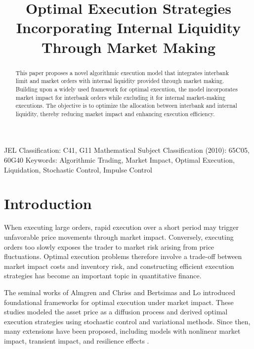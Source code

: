 \documentclass[12pt]{article}
\begin{document}
\title{Optimal Execution Strategies Incorporating Internal Liquidity Through Market Making}

\date{}
\maketitle
\begin{abstract}
This paper proposes a novel algorithmic execution model that integrates interbank limit and market orders with internal liquidity provided through market making. 
Building upon a widely used framework for optimal execution, the model incorporates market impact for interbank orders while excluding it for internal market-making executions. The objective is to optimize the allocation between interbank and internal liquidity, thereby reducing market impact and enhancing execution efficiency.
\end{abstract}

JEL Classification: C41, G11
Mathematical Subject Classification (2010): 65C05, 60G40
Keywords: Algorithmic Trading, Market Impact, Optimal Execution, Liquidation, Stochastic Control, Impulse Control

\section{Introduction}

When executing large orders, rapid execution over a short period may trigger unfavorable price movements through market impact. 
Conversely, executing orders too slowly exposes the trader to market risk arising from price fluctuations. 
Optimal execution problems therefore involve a trade-off between market impact costs and inventory risk, and constructing efficient execution strategies has become an important topic in quantitative finance.

The seminal works of Almgren and Chriss \cite{almgren2001optimal} and Bertsimas and Lo \cite{bertsimas1998optimal} introduced foundational frameworks for optimal execution under market impact. 
These studies modeled the asset price as a diffusion process and derived optimal execution strategies using stochastic control and variational methods. 
Since then, many extensions have been proposed, including models with nonlinear market impact, transient impact, and resilience effects 
\cite{dang2017optimal,gatheral2011exponential,gatheral2012transient,curato2017optimal}.
\end{document}
